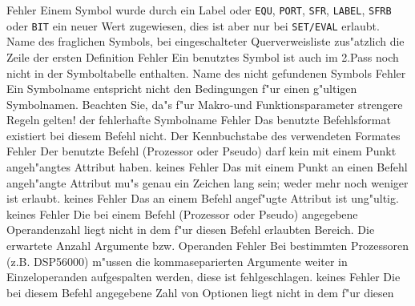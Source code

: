\documentclass[12pt,a4paper,twoside]{report}
\newcommand{\tty}[1]{{\tt #1}}
\begin{document}
\begin{description}
               {Fehler}
               {Einem Symbol wurde durch ein Label oder
	        \tty{EQU}, \tty{PORT}, \tty{SFR}, \tty{LABEL},
	        \tty{SFRB} oder \tty{BIT} ein neuer  Wert zugewiesen, dies
                ist aber nur bei \tty{SET/EVAL} erlaubt.}
               {Name des fraglichen Symbols, bei eingeschalteter
	        Querverweisliste zus"atzlich die Zeile der ersten Definition}
               {Fehler}
               {Ein benutztes Symbol ist auch im 2.Pass noch
                nicht in der Symboltabelle enthalten.}
               {Name des nicht gefundenen Symbols}
               {Fehler}
               {Ein Symbolname entspricht nicht den Bedingungen
                f"ur einen g"ultigen Symbolnamen.  Beachten Sie, da"s f"ur
                Makro-und Funktionsparameter strengere Regeln gelten!}
               {der fehlerhafte Symbolname}
               {Fehler}
               {Das benutzte Befehlsformat existiert bei diesem
                Befehl nicht.}
               {Der Kennbuchstabe des verwendeten Formates}
               {Fehler}
               {Der benutzte Befehl (Prozessor oder Pseudo) darf
                kein mit einem Punkt angeh"angtes Attribut haben.}
               {keines}
               {Fehler}
               {Das mit einem Punkt an einen Befehl angeh"angte
                Attribut mu"s genau ein Zeichen lang sein; weder mehr noch
                weniger ist erlaubt.}
               {keines}
               {Fehler}
               {Das an einem Befehl angef"ugte Attribut ist ung"ultig.}
               {keines}
               {Fehler}
               {Die bei einem Befehl (Prozessor oder Pseudo)
                angegebene Operandenzahl liegt nicht in dem f"ur diesen
                Befehl erlaubten Bereich.}
               {Die erwartete Anzahl Argumente bzw. Operanden}
               {Fehler}
               {Bei bestimmten Prozessoren (z.B. DSP56000)
                m"ussen die kommaseparierten Argumente weiter in
                Einzeloperanden aufgespalten werden, diese ist
                fehlgeschlagen.}
               {keines}
               {Fehler}
               {Die bei diesem Befehl angegebene Zahl
	        von Optionen liegt nicht in dem f"ur diesen
}
\end{description}
\end{document}
